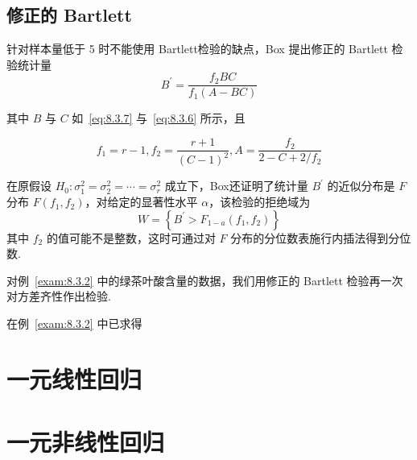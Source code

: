 \subsection{修正的 Bartlett}

针对样本量低于 5 时不能使用 Bartlett检验的缺点，Box 提出修正的 Bartlett 检验统计量
\begin{equation}\label{eq:8.3.9}
  B^{\prime}=\frac{f_{2} B C}{f_{1}(A-B C)}
\end{equation}

其中 $B$ 与 $C$ 如~\eqref{eq:8.3.7} 与~\eqref{eq:8.3.6} 所示，且

\begin{equation*}
  f_{1}=r-1, f_{2}=\frac{r+1}{(C-1)^{2}}, A=\frac{f_{2}}{2-C+2 / f_{2}}
\end{equation*}

在原假设 $H_0:\sigma^2_1=\sigma_2^2=\cdots=\sigma^2_r$ 成立下，Box还证明了统计量 $B^{\prime}$ 的近似分布是 $F$ 分布 $F(f_1,f_2)$，对给定的显著性水平 $\alpha$，该检验的拒绝域为 
\begin{equation}\label{eq:8.3.10}
  W=\left\{B^{\prime}>F_{1-a}\left(f_{1}, f_{2}\right)\right\}
\end{equation}
其中 $f_2$ 的值可能不是整数，这时可通过对 $F$ 分布的分位数表施行内插法得到分位数.


\begin{example}\label{exam:8.3.3}
对例~\ref{exam:8.3.2} 中的绿茶叶酸含量的数据，我们用修正的 Bartlett 检验再一次对方差齐性作出检验.

在例~\ref{exam:8.3.2} 中已求得
\end{example}

\section{一元线性回归}\label{sec:8.4}

\section{一元非线性回归}\label{sec:8.5}